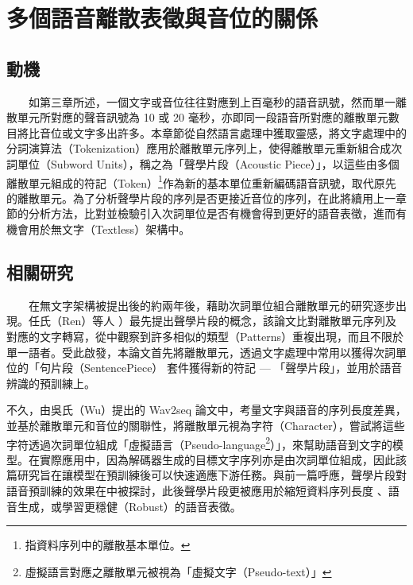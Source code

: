 
\chapter{多個語音離散表徵與音位的關係}   


\section{動機} %

　　如第三章所述，一個文字或音位往往對應到上百毫秒的語音訊號，然而單一離散單元所對應的聲音訊號為 10 或 20 毫秒，亦即同一段語音所對應的離散單元數目將比音位或文字多出許多。本章節從自然語言處理中獲取靈感，將文字處理中的分詞演算法（Tokenization）應用於離散單元序列上，使得離散單元重新組合成次詞單位（Subword Units），稱之為「聲學片段（Acoustic Piece）」，以這些由多個離散單元組成的符記（Token）\footnote{指資料序列中的離散基本單位。}作為新的基本單位重新編碼語音訊號，取代原先的離散單元。為了分析聲學片段的序列是否更接近音位的序列，在此將續用上一章節的分析方法，比對並檢驗引入次詞單位是否有機會得到更好的語音表徵，進而有機會用於無文字（Textless）架構\cite{lakhotia_generative_2021, lakhotia_generative_2021-1, noauthor_textless_2021}中。

\section{相關研究} 

　　在無文字架構被提出後的約兩年後，藉助次詞單位組合離散單元的研究逐步出現。任氏（Ren）等人 \cite{ren_speech_2022}）最先提出聲學片段的概念，該論文比對離散單元序列及對應的文字轉寫，從中觀察到許多相似的類型（Patterns）重複出現，而且不限於單一語者。受此啟發，本論文首先將離散單元，透過文字處理中常用以獲得次詞單位的「句片段（SentencePiece） \cite{kudo_sentencepiece_2018} 套件獲得新的符記 --- 「聲學片段」，並用於語音辨識的預訓練上。

        不久，由吳氏（Wu）提出的 Wav2seq \cite{wu_wav2seq_2023}論文中，考量文字與語音的序列長度差異，並基於離散單元和音位的關聯性，將離散單元視為字符（Character），嘗試將這些字符透過次詞單位組成「虛擬語言（Pseudo-language\footnote{虛擬語言對應之離散單元被視為「虛擬文字（Pseudo-text）」}）」，來幫助語音到文字的模型。在實際應用中，因為解碼器生成的目標文字序列亦是由次詞單位組成，因此該篇研究旨在讓模型在預訓練後可以快速適應下游任務。與前一篇呼應，聲學片段對語音預訓練的效果在\cite{10096788}中被探討，此後聲學片段更被應用於縮短資料序列長度\cite{chang_exploration_2023} 、語音生成\cite{shen2024acoustic}，或學習更穩健（Robust）的語音表徵\cite{chang2023r}。

